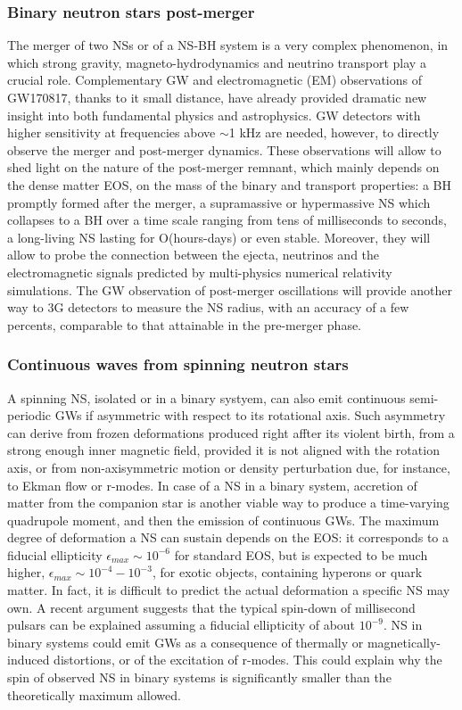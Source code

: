 \subsubsection{Binary neutron stars post-merger}
The merger of two NSs or of a NS-BH system is a very complex phenomenon, in which strong gravity, magneto-hydrodynamics and neutrino transport play a crucial role. Complementary GW and electromagnetic (EM) observations of GW170817, thanks to it small distance, have already provided dramatic new insight into both fundamental physics and astrophysics. GW detectors with higher sensitivity at frequencies above $\sim$1 kHz are needed, however, to directly observe the merger and post-merger dynamics. These observations will allow to shed light on the nature of the post-merger remnant, which mainly depends on the dense matter EOS, on the mass of the binary and transport properties: a BH promptly formed after the merger, a supramassive or hypermassive NS which collapses to a BH over a time scale ranging from tens of milliseconds to seconds, a long-living NS lasting for O(hours-days) or even stable. Moreover, they will allow to probe the connection between the ejecta, neutrinos and the electromagnetic signals predicted by multi-physics numerical relativity simulations. The GW observation of post-merger oscillations will provide another way to 3G detectors to measure the NS radius, with an accuracy of a few percents, comparable to that attainable in the pre-merger phase. 

\subsubsection{Continuous waves from spinning neutron stars}
A spinning NS, isolated or in a binary systyem, can also emit continuous semi-periodic GWs if asymmetric with respect to its rotational axis. Such asymmetry can derive from frozen deformations produced right affter its violent birth, from a strong enough inner magnetic field, provided it is not aligned with the rotation axis, or from non-axisymmetric motion or density perturbation due, for instance, to Ekman flow or r-modes. In case of a NS in a binary system, accretion of matter from the companion star is another viable way to produce a time-varying quadrupole moment, and then the emission of continuous GWs. The maximum degree of deformation a NS can sustain depends on the EOS: it corresponds to a fiducial ellipticity $\epsilon_{max} \sim 10^{-6}$ for standard EOS, but is expected to be much higher, $\epsilon_{max}\sim 10^{-4}-10^{-3}$, for exotic objects, containing hyperons or quark matter. In fact, it is difficult to predict the actual deformation a specific NS may own. A recent argument suggests that the typical spin-down of millisecond pulsars can be explained assuming a fiducial ellipticity of about $10^{-9}$. NS in binary systems could emit GWs as a consequence of thermally or magnetically-induced distortions, or of the excitation of r-modes. This could explain why the spin of observed NS in binary systems is significantly smaller than the theoretically maximum allowed. 

